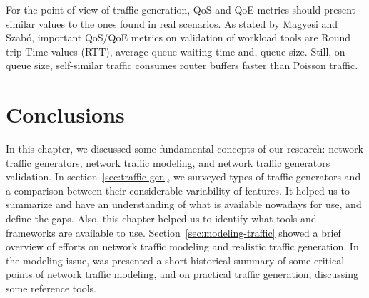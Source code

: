 For the point of view of traffic generation, QoS and QoE metrics should present similar values to the ones found in real scenarios. As stated by Magyesi and Szabó\cite{validate-trafficgen}, important QoS/QoE metrics on validation of workload tools are Round trip Time values (\acrshort{RTT}), average queue waiting time and, queue size. Still, on queue size, self-similar traffic consumes router buffers faster than Poisson traffic\cite{multi-player-online-game-self-similarity}.

\section{Conclusions}


In this chapter, we discussed some fundamental concepts of our research: network traffic generators, network traffic modeling, and network traffic generators validation. In section~\ref{sec:traffic-gen}, we surveyed types of traffic generators and a comparison between their considerable variability of features. It helped us to summarize and have an understanding of what is available nowadays for use, and define the gaps. Also, this chapter helped us to identify what tools and frameworks are available to use. Section~\ref{sec:modeling-traffic} showed a brief overview of efforts on network traffic modeling and realistic traffic generation. In the modeling issue, was presented a short historical summary of some critical points of network traffic modeling, and on practical traffic generation, discussing some reference tools.


